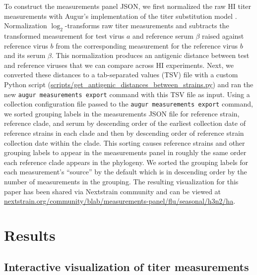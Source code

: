 \documentclass[utf8]{FrontiersinHarvard} %
\begin{document}
To construct the measurements panel JSON, we first normalized the raw HI titer measurements with Augur's implementation of the titer substitution model \citep{Neher:2016hy}.
Normalization $\log_{2}$-transforms raw titer measurements and subtracts the transformed measurement for test virus $a$ and reference serum $\beta$ raised against reference virus $b$ from the corresponding measurement for the reference virus $b$ and its serum $\beta$.
This normalization produces an antigenic distance between test and reference viruses that we can compare across HI experiments.
Next, we converted these distances to a tab-separated values (TSV) file with a custom Python script (\href{https://github.com/blab/measurements-panel/blob/4474cf1bbffbc9243330d4331349678f98533a02/scripts/get_antigenic_distances_between_strains.py}{scripts/get\_antigenic\_distances\_between\_strains.py}) and ran the new \texttt{augur measurements export} command with this TSV file as input.
Using a collection configuration file passed to the \texttt{augur measurements export} command, we sorted grouping labels in the measurements JSON file for reference strain, reference clade, and serum by descending order of the earliest collection date of reference strains in each clade and then by descending order of reference strain collection date within the clade.
This sorting causes reference strains and other grouping labels to appear in the measurements panel in roughly the same order each reference clade appears in the phylogeny.
We sorted the grouping labels for each measurement's ``source'' by the default which is in descending order by the number of measurements in the grouping.
The resulting visualization for this paper has been shared via Nextstrain community and can be viewed at \href{https://nextstrain.org/community/blab/measurements-panel/flu/seasonal/h3n2/ha}{nextstrain.org/community/blab/measurements-panel/flu/seasonal/h3n2/ha}.

\section{Results}

\subsection{Interactive visualization of titer measurements}
\end{document}
